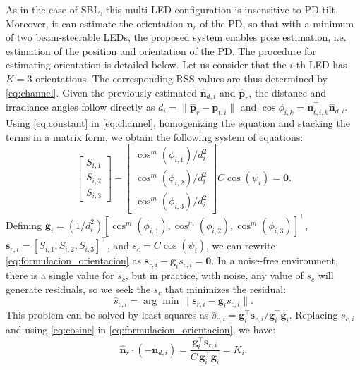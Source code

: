 \documentclass[conference]{IEEEtran}
\begin{document}
As in the case of SBL, this multi-LED configuration is insensitive to PD tilt. Moreover, it can estimate the orientation $\mathbf{n}_r$ of the PD, so that with a minimum of two beam-steerable LEDs, the proposed system enables pose estimation, i.e. estimation of the position and orientation of the PD. The procedure for estimating orientation is detailed below. Let us consider that the $i$-th LED has $K=3$ orientations. The corresponding RSS values are thus determined by \eqref{eq:channel}. Given the previously estimated $\hat{\mathbf n}_{d,i}$ and $\hat{\mathbf p}_r$, the distance and irradiance angles follow directly as $d_i=\|\hat{\mathbf p}_r-\mathbf p_{t,i}\|$ and $\cos\phi_{i,k}=\mathbf n_{t,i,k}^{\top}\hat{\mathbf n}_{d,i}$. Using \eqref{eq:constant} in \eqref{eq:channel}, homogenizing the equation and stacking the terms in a matrix form, we obtain the following system of equations:
\begin{equation}
     \begin{bmatrix}
        S_{i,1} \\
        S_{i,2} \\
        S_{i,3}
    \end{bmatrix}
    -
    \begin{bmatrix}
        \cos^m{(\phi_{i,1})} / d_i^2\\
        \cos^m{(\phi_{i,2})} / d_i^2\\
        \cos^m{(\phi_{i,3})} / d_i^2
    \end{bmatrix}
    C\cos(\psi_i) = \mathbf{0}.
    \label{eq:formulacion_orientacion}
\end{equation}
Defining $\mathbf{g}_i=(1/d_i^2)[\cos^m{(\phi_{i,1})},\cos^m{(\phi_{i,2})},\cos^m{(\phi_{i,3})}]^\top$,
$\mathbf{s}_{r,i}=[S_{i,1},S_{i,2},S_{i,3}]^\top$, and $s_c = C\cos(\psi_i)$, we can rewrite \eqref{eq:formulacion_orientacion} as $\mathbf{s}_{r,i} - \mathbf{g}_i s_{c,i} = \mathbf{0}$.
In a noise-free environment, there is a single value for $s_c$, but in practice, with noise, any value of $s_c$ will generate residuals, so we seek the $s_c$ that minimizes the residual:
\begin{equation}
    \hat s_{c,i} = \arg \min \| \mathbf{s}_{r,i} -  \mathbf{g}_i s_{c,i} \|.
    \label{eq:opt_orientation}
\end{equation}
This problem can be solved by least squares as
\(
\hat s_{c,i} = {\mathbf{g}_i^{\top}\mathbf{s}_{r,i}} / {\mathbf{g}_i^{\top}\mathbf{g}_i}.
\)
Replacing $s_{c,i}$ and using \eqref{eq:cosine} in \eqref{eq:formulacion_orientacion}, we have:
\begin{equation}
    \hat{\mathbf{n}}_r \cdot (-\mathbf{n}_{d,i})
        = \frac{\mathbf{g}_i^{\top}\mathbf{s}_{r,i}}{ C \, \mathbf{g}_i^{\top}\mathbf{g}_i}
        = K_i.
    \label{eq:resolver_n_r}
\end{equation}
\end{document}
